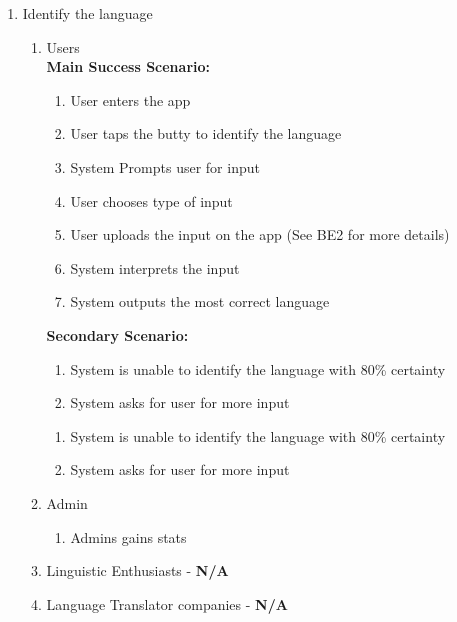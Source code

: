 \begin{enumerate}[{\bf BE1.}]



	\item Identify the language
		\begin{enumerate}[{\bf VP1.}]
			\item Users \\
				\textbf{Main Success Scenario:}
					\begin{enumerate}[{\bf 1.}]
						\item User enters the app
						\item User taps the butty to identify the language
							\item System Prompts user for input
							\item User chooses type of input
							\item User uploads the input on the app (See BE2 for more details)
							\item System interprets the input
							\item System outputs the most correct language
					\end{enumerate}
					\textbf{Secondary Scenario:}
					\begin{enumerate}[{\bf 7.i.}]
						\item System is unable to identify the language with 80\% certainty
						\item System asks for user for more input
					\end{enumerate} 
					\begin{enumerate}[{\bf 8.}]
						\item System is unable to identify the language with 80\% certainty
						\item System asks for user for more input
					\end{enumerate} 
			\item Admin
				\begin{enumerate}[resume]
					\item Admins gains stats
				\end{enumerate}
			\item Linguistic Enthusiasts - \textbf{N/A}
			\item Language Translator companies - \textbf{N/A}
		\end{enumerate}

	


\end{enumerate}

